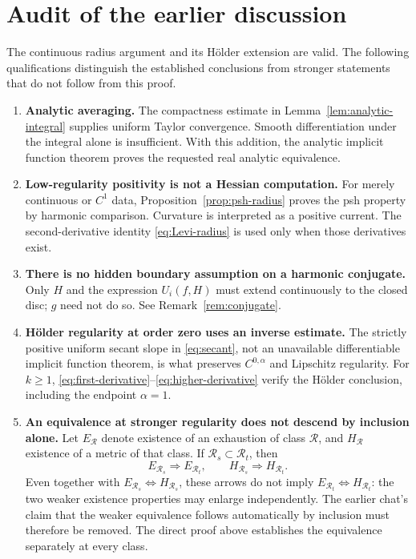 \documentclass[11pt]{amsart}
\theoremstyle{definition}
\theoremstyle{remark}
\numberwithin{equation}{section}
\newcommand{\Reg}{\mathcal R}
\begin{document}
\section{Audit of the earlier discussion}

The continuous radius argument and its H\"older extension are valid.
The following qualifications distinguish the established conclusions
from stronger statements that do not follow from this proof.

\begin{enumerate}[label=\textup{\arabic*.},leftmargin=*]
\item \textbf{Analytic averaging.}
The compactness estimate in Lemma~\ref{lem:analytic-integral} supplies
uniform Taylor convergence. Smooth differentiation under the integral
alone is insufficient. With this addition, the analytic implicit
function theorem proves the requested real analytic equivalence.

\item \textbf{Low-regularity positivity is not a Hessian computation.}
For merely continuous or $C^1$ data, Proposition~\ref{prop:psh-radius}
proves the psh property by harmonic comparison. Curvature is interpreted
as a positive current. The second-derivative identity
\eqref{eq:Levi-radius} is used only when those derivatives exist.

\item \textbf{There is no hidden boundary assumption on a harmonic conjugate.}
Only $H$ and the expression $U_i(f,H)$ must extend continuously to the
closed disc; $g$ need not do so. See Remark~\ref{rem:conjugate}.

\item \textbf{H\"older regularity at order zero uses an inverse estimate.}
The strictly positive uniform secant slope in \eqref{eq:secant}, not
an unavailable differentiable implicit function theorem, is what
preserves $C^{0,\alpha}$ and Lipschitz regularity. For $k\ge1$,
\eqref{eq:first-derivative}--\eqref{eq:higher-derivative} verify the
H\"older conclusion, including the endpoint $\alpha=1$.

\item \textbf{An equivalence at stronger regularity does not descend by inclusion alone.}
Let $E_{\Reg}$ denote existence of an exhaustion of class $\Reg$, and
$H_{\Reg}$ existence of a metric of that class. If
$\Reg_s\subset\Reg_t$, then
\[
E_{\Reg_s}\Longrightarrow E_{\Reg_t},\qquad
H_{\Reg_s}\Longrightarrow H_{\Reg_t}.
\]
Even together with $E_{\Reg_s}\Longleftrightarrow H_{\Reg_s}$, these
arrows do not imply $E_{\Reg_t}\Longleftrightarrow H_{\Reg_t}$:
the two weaker existence properties may enlarge independently.
The earlier chat's claim that the weaker equivalence follows
automatically by inclusion must therefore be removed. The direct
proof above establishes the equivalence separately at every class.


\end{enumerate}
\end{document}
